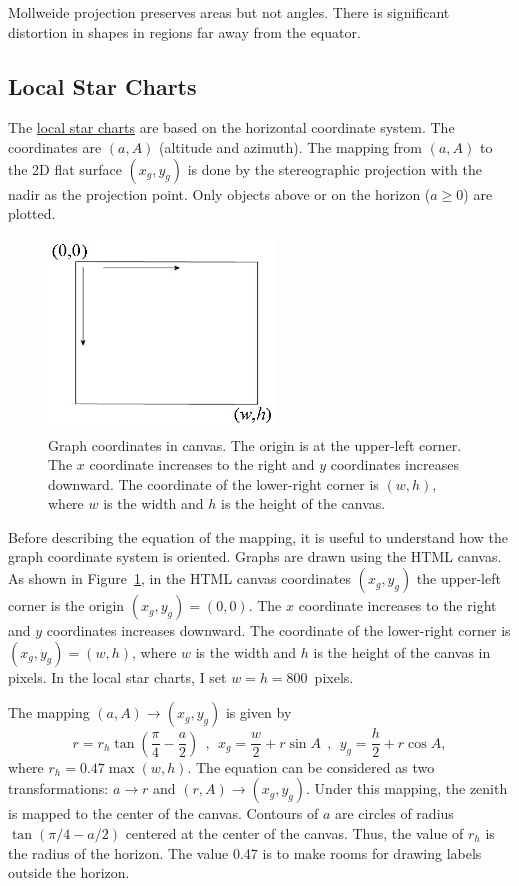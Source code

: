 \documentclass[12pt]{article}
\newcommand \beq {\begin{equation}}
\newcommand \eeq {\end{equation}}
\begin{document}
Mollweide projection preserves areas but not angles. There is significant 
distortion in shapes in regions far away from the equator.

\subsection{Local Star Charts}

The \href{../sidereal.html}{local star charts} are based on the horizontal 
coordinate system. The coordinates are $(a,A)$ (altitude and azimuth). The mapping 
from $(a,A)$ to the 2D flat surface $(x_g,y_g)$ is done by the stereographic projection 
with the nadir as the projection point. 
Only objects above or on the horizon ($a \geq 0$) are plotted.

\begin{figure}[h]
\begin{center}
\includegraphics[width=6cm]{computerGraphics.jpg}
\end{center}
\caption{Graph coordinates in canvas. The origin is at the upper-left corner. 
The $x$ coordinate increases to the right and $y$ coordinates increases downward. 
The coordinate of the lower-right corner is $(w,h)$, where $w$ is the width 
and $h$ is the height of the canvas.}
\label{fig:computerGraphics}
\end{figure}

Before describing the equation of the mapping, it is useful to understand how the 
graph coordinate system is oriented. Graphs are drawn using the HTML canvas. 
As shown in Figure~\ref{fig:computerGraphics}, in the HTML canvas coordinates $(x_g,y_g)$
the upper-left corner is the origin $(x_g,y_g)=(0,0)$. The $x$ coordinate increases to the 
right and $y$ coordinates increases downward. The coordinate of the lower-right 
corner is $(x_g,y_g)=(w,h)$, where $w$ is the width and $h$ is the height of the canvas 
in pixels. In the local star charts, I set $w=h=800$~pixels.

The mapping $(a,A) \rightarrow (x_g,y_g)$ is given by 
\beq 
  r = r_h \tan\left( \frac{\pi}{4} -\frac{a}{2}\right) \ \ , \ \ 
  x_g = \frac{w}{2} + r \sin A \ \ , \ \ y_g = \frac{h}{2} + r \cos A , 
\label{eq:stereographicHor}
\eeq
where $r_h = 0.47\max(w,h)$. The equation can be considered as two transformations: 
$a \rightarrow r$ and $(r,A) \rightarrow (x_g, y_g)$. Under this mapping, the zenith 
is mapped to the center of the canvas. Contours of $a$ are circles 
of radius $\tan(\pi/4 - a/2)$ centered at the center of the canvas. Thus, the value of 
$r_h$ is the radius of the horizon. The value 0.47 is to make rooms for drawing labels 
outside the horizon.
\end{document}
